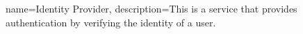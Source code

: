 {
    name=Identity Provider,
    description={This is a service that provides authentication by verifying the identity of a user.}
}
